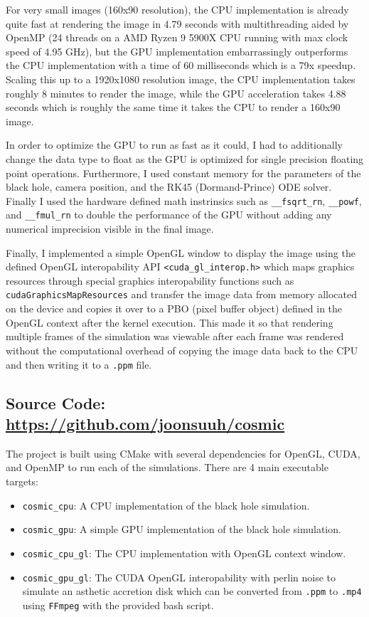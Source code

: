 \documentclass[../main.tex]{subfiles}
\begin{document}
For very small images (160x90 resolution), the CPU implementation is already quite fast
at rendering the image in 4.79 seconds with multithreading aided by OpenMP
(24 threads on a AMD Ryzen 9 5900X CPU running with max clock speed of 4.95 GHz), but the
GPU implementation embarrassingly outperforms the CPU implementation with a time of 60 milliseconds
which is a 79x speedup. Scaling this up to a 1920x1080 resolution image, the CPU implementation
takes roughly 8 minutes to render the image, while the GPU acceleration takes 4.88 seconds which
is roughly the same time it takes the CPU to render a 160x90 image.

In order to optimize the GPU to run as fast as it could, I had to additionally change the data
type to float as the GPU is optimized for single precision floating point operations. Furthermore,
I used constant memory for the parameters of the black hole, camera position, and the RK45
(Dormand-Prince) ODE solver. Finally I used the hardware defined math instrinsics such as
\texttt{\_\_fsqrt\_rn}, \texttt{\_\_powf}, and \texttt{\_\_fmul\_rn} to double the performance 
of the GPU without adding any numerical imprecision visible in the final image.

Finally, I implemented a simple OpenGL window to display the image using the defined OpenGL
interopability API \texttt{<cuda\_gl\_interop.h>} which maps graphics resources through special
graphics interopability functions such as \texttt{cudaGraphicsMapResources} and transfer the image
data from memory allocated on the device and copies it over to a PBO (pixel buffer object)
defined in the OpenGL context after the kernel execution. This made it so that rendering multiple
frames of the simulation was viewable after each frame was rendered without the computational
overhead of copying the image data back to the CPU and then writing it to a \texttt{.ppm} file.

\subsection*{Source Code: \url{https://github.com/joonsuuh/cosmic}}

The project is built using CMake with several dependencies for OpenGL, CUDA, and OpenMP to
run each of the simulations. There are 4 main executable targets:
\begin{itemize}
    \item \texttt{cosmic\_cpu}: A CPU implementation of the black hole simulation.
    \item \texttt{cosmic\_gpu}: A simple GPU implementation of the black hole simulation.
    \item \texttt{cosmic\_cpu\_gl}: The CPU implementation with OpenGL context window.
    \item \texttt{cosmic\_gpu\_gl}: The CUDA OpenGL interopability with perlin noise to simulate
    an asthetic accretion disk which can be converted from \texttt{.ppm} to \texttt{.mp4} using
    \texttt{FFmpeg} with the provided bash script.
\end{itemize}
\end{document}
